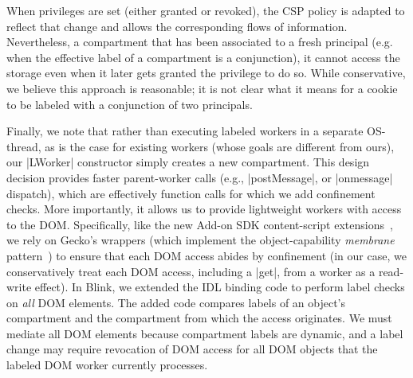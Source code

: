 When privileges are set (either granted or revoked), the CSP policy is adapted
to reflect that change and allows the corresponding flows of
information. Nevertheless, a compartment that has been associated to a fresh
principal (e.g. when the effective label of a compartment is a conjunction), it
cannot access the storage even when it later gets granted the privilege to do
so. While conservative, we believe this approach is reasonable; it is not clear
what it means for a cookie to be labeled with a conjunction of
two principals.

%

Finally, we note that rather than executing labeled workers in a
separate OS-thread, as is the case for existing workers (whose goals
are different from ours), our \js|LWorker| constructor simply creates a new
compartment. This design decision provides 
%
faster parent-worker calls (e.g.,
\js|postMessage|, or \js|onmessage| dispatch), which are effectively function
calls for which we add confinement checks. 
%
More importantly, it allows us to provide lightweight workers with access to the
DOM.
%
Specifically, like the new Add-on SDK content-script
extensions~\cite{addon-sdk}, we rely on Gecko's wrappers (which implement the
object-capability \emph{membrane}
pattern~\cite{miller2003paradigm,miller2006robust}) to ensure that each DOM
access abides by confinement (in our case, we conservatively treat each DOM
access, including a \js|get|, from a worker as a read-write effect).
%
In Blink, we extended the IDL binding code to perform label
checks on \emph{all} DOM elements.
%
The added code compares labels of an object's compartment and the compartment
from which the access originates.
%
We must mediate all DOM elements because compartment labels are dynamic, and a
label change may require revocation of DOM access for all DOM objects that the
labeled DOM worker currently processes.



